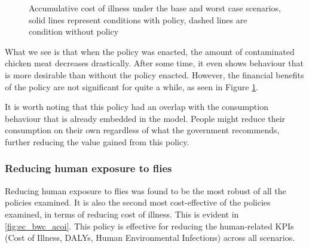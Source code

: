 \begin{figure}[h!]
\begin{minipage}{0.45\textwidth}
        \caption{Accumulative cost of illness under the base and worst case scenarios, solid lines represent conditions with policy, dashed lines are condition without policy}
        \label{fig:pc_bwc_acoi}
    \end{minipage}
\end{figure}

What we see is that when the policy was enacted, the amount of contaminated chicken meat decreases drastically. After some time, it even shows behaviour that is more desirable than without the policy enacted. However, the financial benefits of the policy are not significant for quite a while, as seen in Figure \ref{fig:pc_bwc_acoi}. 

It is worth noting that this policy had an overlap with the consumption behaviour that is already embedded in the model. People might reduce their consumption on their own regardless of what the government recommends, further reducing the value gained from this policy.

\subsubsection{Reducing human exposure to flies}
\label{reducing human exposure to flies}
Reducing human exposure to flies was found to be the most robust of all the policies examined. It is also the second most cost-effective of the policies examined, in terms of reducing cost of illness. This is evident in \ref{fig:ec_bwc_acoi}. This policy is effective for reducing the human-related KPIs (Cost of Illness, DALYs, Human Environmental Infections) across all scenarios. 

